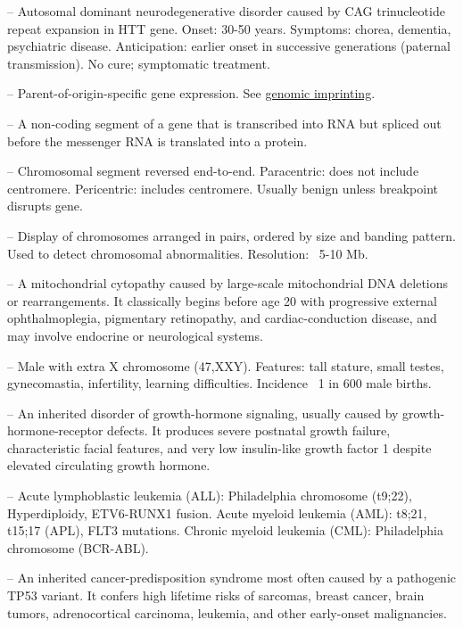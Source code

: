 -- Autosomal dominant neurodegenerative disorder caused by CAG trinucleotide repeat expansion in HTT gene. Onset: 30-50 years. Symptoms: chorea, dementia, psychiatric disease. Anticipation: earlier onset in successive generations (paternal transmission). No cure; symptomatic treatment.

-- Parent-of-origin-specific gene expression. See \hyperlink{Genomic Imprinting}{genomic imprinting}.

-- A non-coding segment of a gene that is transcribed into RNA but spliced out before the messenger RNA is translated into a protein.

-- Chromosomal segment reversed end-to-end. Paracentric: does not include centromere. Pericentric: includes centromere. Usually benign unless breakpoint disrupts gene.

-- Display of chromosomes arranged in pairs, ordered by size and banding pattern. Used to detect chromosomal abnormalities. Resolution: ~5-10 Mb.

-- A mitochondrial cytopathy caused by large-scale mitochondrial DNA deletions or rearrangements. It classically begins before age 20 with progressive external ophthalmoplegia, pigmentary retinopathy, and cardiac-conduction disease, and may involve endocrine or neurological systems.

-- Male with extra X chromosome (47,XXY). Features: tall stature, small testes, gynecomastia, infertility, learning difficulties. Incidence ~1 in 600 male births.

-- An inherited disorder of growth-hormone signaling, usually caused by growth-hormone-receptor defects. It produces severe postnatal growth failure, characteristic facial features, and very low insulin-like growth factor 1 despite elevated circulating growth hormone.

-- Acute lymphoblastic leukemia (ALL): Philadelphia chromosome (t9;22), Hyperdiploidy, ETV6-RUNX1 fusion. Acute myeloid leukemia (AML): t8;21, t15;17 (APL), FLT3 mutations. Chronic myeloid leukemia (CML): Philadelphia chromosome (BCR-ABL).

-- An inherited cancer-predisposition syndrome most often caused by a pathogenic TP53 variant. It confers high lifetime risks of sarcomas, breast cancer, brain tumors, adrenocortical carcinoma, leukemia, and other early-onset malignancies.

